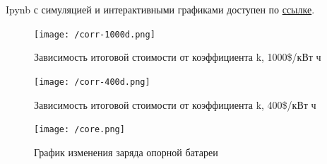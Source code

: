     Ipynb с симуляцией и интерактивными графиками доступен по  \href{https://github.com/niquepolice/electro/blob/milp/milp.ipynb}{ссылке}.
    
    
    \begin{figure}[]
\texttt{[image: /corr-1000d.png]}
\centering
\caption{Зависимость итоговой стоимости от коэффициента k, 1000\$/кВт ч}
\label{fig:corr-1000}
\end{figure}

\begin{figure}[]
\texttt{[image: /corr-400d.png]}
\centering
\caption{Зависимость итоговой стоимости от коэффициента k, 400\$/кВт ч}
\label{fig:corr-400}
\end{figure}

\begin{figure}[]
\texttt{[image: /core.png]}
\centering
\caption{График изменения заряда опорной батареи}
\label{fig:core}
\end{figure}

